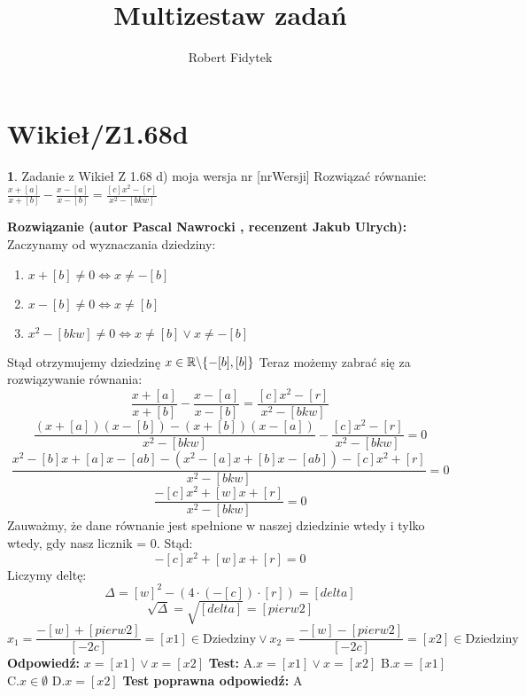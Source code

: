 \documentclass[12pt, a4paper]{article}
\title{Multizestaw zadań}
\author{Robert Fidytek}
\date{}
\theoremstyle{definition} %
\newtheorem{zad}{}
\newcommand{\kategoria}[1]{\section{#1}} %
\newcommand{\zadStart}[1]{\begin{zad}#1\newline} %
\newcommand{\zadStop}{\end{zad}}   %
\newcommand{\rozwStart}[2]{\noindent \textbf{Rozwiązanie (autor #1 , recenzent #2): }\newline} %
\newcommand{\odpStart}{\noindent \textbf{Odpowiedź:}\newline}    %
\newcommand{\odpStop}{\newline}                                             %
\newcommand{\testStart}{\noindent \textbf{Test:}\newline} %
\newcommand{\testStop}{\newline} %
\newcommand{\kluczStart}{\noindent \textbf{Test poprawna odpowiedź:}\newline} %
\newcommand{\kluczStop}{\newline} %
\begin{document}
\maketitle


\kategoria{Wikieł/Z1.68d}
\zadStart{Zadanie z Wikieł Z 1.68 d) moja wersja nr [nrWersji]}
Rozwiązać równanie: $\frac{x+[a]}{x+[b]}-\frac{x-[a]}{x-[b]}=\frac{[c]x^2-[r]}{x^2-[bkw]}$
\zadStop
\rozwStart{Pascal Nawrocki}{Jakub Ulrych}
Zaczynamy od wyznaczania dziedziny:
\begin{enumerate}
\item $x+[b]\neq0 \Leftrightarrow x\neq-[b]$
\item $x-[b] \neq0 \Leftrightarrow x\neq[b]$
\item $x^2-[bkw]\neq0 \Leftrightarrow x\neq[b] \vee x\neq-[b]$
\end{enumerate}
Stąd otrzymujemy dziedzinę $x\in\mathbb{R}\symbol{92}\{-[b],[b]\}$
Teraz możemy zabrać się za rozwiązywanie równania:
$$\frac{x+[a]}{x+[b]}-\frac{x-[a]}{x-[b]}=\frac{[c]x^2-[r]}{x^2-[bkw]}$$
$$\frac{(x+[a])(x-[b])-(x+[b])(x-[a])}{x^2-[bkw]}-\frac{[c]x^2-[r]}{x^2-[bkw]}=0$$
$$\frac{x^2-[b]x+[a]x-[ab]-(x^2-[a]x+[b]x-[ab])-[c]x^2+[r]}{x^2-[bkw]}=0$$
$$\frac{-[c]x^2+[w]x+[r]}{x^2-[bkw]}=0$$
Zauważmy, że dane równanie jest spełnione w naszej dziedzinie wtedy i tylko wtedy, gdy nasz licznik = 0. Stąd:
$$-[c]x^2+[w]x+[r]=0$$
Liczymy deltę:
$$\Delta=[w]^2-(4\cdot(-[c])\cdot[r])=[delta]$$
$$\sqrt{\Delta}=\sqrt{[delta]}=[pierw2]$$
$$x_1=\frac{-[w]+[pierw2]}{[-2c]}=[x1]\in\text{Dziedziny} \vee x_2=\frac{-[w]-[pierw2]}{[-2c]}=[x2]\in\text{Dziedziny}$$
\odpStart
$x=[x1] \vee x=[x2]$
\odpStop
\testStart
A.$x=[x1] \vee x=[x2]$
B.$x=[x1]$
C.$x\in\emptyset$
D.$x=[x2]$
\testStop
\kluczStart
A
\kluczStop
\end{document}
